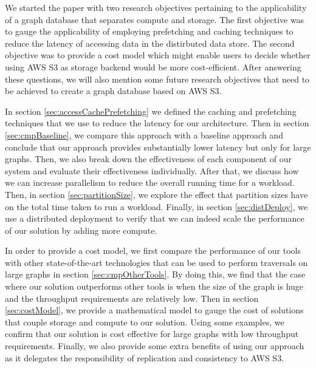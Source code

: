 We started the paper with two research objectives pertaining to the
applicability of a graph database that separates compute and storage. The first
objective was to gauge the applicability of employing prefetching and caching
techniques to reduce the latency of accessing data in the distirbuted data
store. The second objective was to provide a cost model which might enable users
to decide whether using AWS S3 as storage backend would be more cost-efficient.
After answering these questions, we will also mention some future research
objectives that need to be achieved to create a graph database based on AWS S3.

\medskip
In section \ref{sec:accessCachePrefetching} we defined the caching and
prefetching techniques that we use to reduce the latency for our architecture.
Then in section \ref{sec:cmpBaseline}, we compare this approach with a baseline
approach and conclude that our approach provides substantially lower latency but
only for large graphs. Then, we also break down the effectiveness of each
component of our system and evaluate their effectiveness individually. After
that, we discuss how we can increase parallelism to reduce the overall running
time for a workload. Then, in section \ref{sec:partitionSize}, we
explore the effect that partition sizes have on the total time taken to run a
workload. Finally, in section \ref{sec:distDeploy}, we use a distributed
deployment to verify that we can indeed scale the performance of our solution by
adding more compute.

\medskip
In order to provide a cost model, we first compare the performance of our tools
with other state-of-the-art technologies that can be used to perform traversals
on large graphs in section \ref{sec:cmpOtherTools}. By doing this, we find that 
the case where our solution outperforms other tools is when the size of the
graph is huge and the throughput requirements are relatively low. Then in
section \ref{sec:costModel}, we provide a mathematical model to gauge the cost
of solutions that couple storage and compute to our solution. Using some
examples, we confirm that our solution is cost effective for large graphs with
low throughput requirements. Finally, we also provide some extra benefits of
using our approach as it delegates the responsibility of replication and
consistency to AWS S3.


